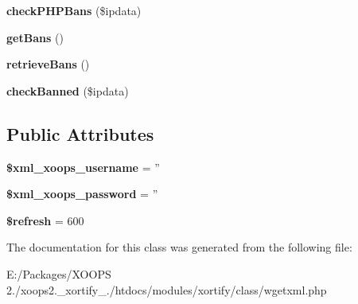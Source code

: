 \begin{DoxyCompactItemize}
\item 
\hypertarget{class_w_g_e_t_x_m_l_xortify_exchange_af9bc3eac0af877460b904b349937393f}{{\bfseries check\-P\-H\-P\-Bans} (\$ipdata)}\label{class_w_g_e_t_x_m_l_xortify_exchange_af9bc3eac0af877460b904b349937393f}

\item 
\hypertarget{class_w_g_e_t_x_m_l_xortify_exchange_a8785d899cea50a25b5e1ca7e5edab10b}{{\bfseries get\-Bans} ()}\label{class_w_g_e_t_x_m_l_xortify_exchange_a8785d899cea50a25b5e1ca7e5edab10b}

\item 
\hypertarget{class_w_g_e_t_x_m_l_xortify_exchange_a4d18d90a0c51d323692dfaa06e6028c1}{{\bfseries retrieve\-Bans} ()}\label{class_w_g_e_t_x_m_l_xortify_exchange_a4d18d90a0c51d323692dfaa06e6028c1}

\item 
\hypertarget{class_w_g_e_t_x_m_l_xortify_exchange_adbe850940c3a39d0ba5a6daa0044d5ba}{{\bfseries check\-Banned} (\$ipdata)}\label{class_w_g_e_t_x_m_l_xortify_exchange_adbe850940c3a39d0ba5a6daa0044d5ba}

\end{DoxyCompactItemize}
\subsection*{Public Attributes}
\begin{DoxyCompactItemize}
\item 
\hypertarget{class_w_g_e_t_x_m_l_xortify_exchange_a0436d97e7943301c96b981385da1ac17}{{\bfseries \$xml\-\_\-xoops\-\_\-username} = ''}\label{class_w_g_e_t_x_m_l_xortify_exchange_a0436d97e7943301c96b981385da1ac17}

\item 
\hypertarget{class_w_g_e_t_x_m_l_xortify_exchange_ab67703d109f911779a6d48be0bcdee97}{{\bfseries \$xml\-\_\-xoops\-\_\-password} = ''}\label{class_w_g_e_t_x_m_l_xortify_exchange_ab67703d109f911779a6d48be0bcdee97}

\item 
\hypertarget{class_w_g_e_t_x_m_l_xortify_exchange_a518c865f67a88fe99996319119585cf8}{{\bfseries \$refresh} = 600}\label{class_w_g_e_t_x_m_l_xortify_exchange_a518c865f67a88fe99996319119585cf8}

\end{DoxyCompactItemize}


The documentation for this class was generated from the following file\-:\begin{DoxyCompactItemize}
\item 
E\-:/\-Packages/\-X\-O\-O\-P\-S 2./xoops2.\-\_\-xortify\-\_./htdocs/modules/xortify/class/wgetxml.\-php\end{DoxyCompactItemize}
